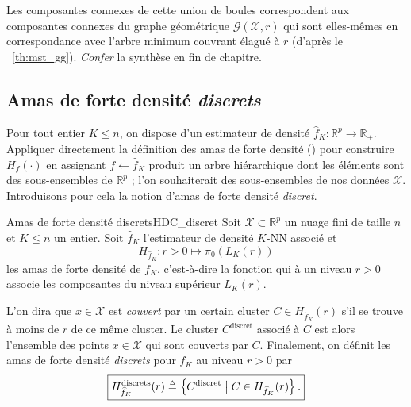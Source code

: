 Les composantes connexes de cette union de boules correspondent aux composantes connexes du graphe géométrique $\mathcal G(\mathcal X, r)$ qui sont elles-mêmes en correspondance avec l'arbre minimum couvrant élagué à $r$ (d'après le \Th~\ref{th:mst_gg}).
\emph{Confer} la synthèse en fin de chapitre.


\subsection{Amas de forte densité \emph{discrets}}

Pour tout entier $K \le n$, on dispose d'un estimateur de densité $\widehat f_{K} \colon \mathbb R^p \to \mathbb R_+$.
Appliquer directement la définition des amas de forte densité () pour construire $H_f(\cdot)$  en assignant $f \gets \widehat f_{K}$ produit un arbre hiérarchique dont les éléments sont des sous-ensembles de $\mathbb R^p$ ; l'on souhaiterait des sous-ensembles de nos données $\mathcal X$. Introduisons pour cela la notion d'amas de forte densité \emph{discret}.

\begin{Definition}{Amas de forte densité discrets}{HDC_discret}
Soit $\mathcal X \subset \mathbb R^p$ un nuage fini de taille $n$ et $K \le n$ un entier. 
Soit $\widehat f_K$ l'estimateur de densité $K$-NN associé et 
\[
H_{\widehat f_K} \colon r > 0\mapsto \pi_0\left( L_K(r)\right)
\]
les amas de forte densité de $f_K$, c'est-à-dire la fonction qui à un niveau $r > 0$ associe les composantes du niveau supérieur $L_K(r)$.

L'on dira que $x \in \mathcal X$ est \emph{couvert} par un certain cluster  $C \in H_{\widehat f_K}(r)$ s'il se trouve à moins de $r$ de ce même cluster. Le cluster $C^{\mathrm{discret}}$ associé à $C$ est alors l'ensemble des points $x\in \mathcal X$ qui sont couverts par $C$.
Finalement, on définit les amas de forte densité \emph{discrets} pour $f_K$ au niveau $r > 0$ par
\[
\boxed{
     H_{\widehat f_K}^{\mathrm{discrets}}(r) \triangleq  \left\{ C^{\mathrm{discret}} \bigm|  C \in  H_{\widehat f_K}(r)  \right\}.
    }
\]
\end{Definition}

